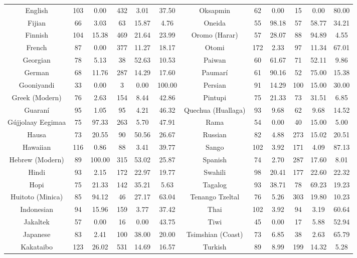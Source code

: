 \begin{tabular}{cccccccccccc}
English & 103 & 0.00 & 432 & 3.01 & 37.50 & Oksapmin & 62 & 0.00 & 15 & 0.00 & 80.00 \\
Fijian & 66 & 3.03 & 63 & 15.87 & 4.76 & Oneida & 55 & 98.18 & 57 & 58.77 & 34.21 \\
Finnish & 104 & 15.38 & 469 & 21.64 & 23.99 & Oromo (Harar) & 57 & 28.07 & 88 & 94.89 & 4.55 \\
French & 87 & 0.00 & 377 & 11.27 & 18.17 & Otomi & 172 & 2.33 & 97 & 11.34 & 67.01 \\
Georgian & 78 & 5.13 & 38 & 52.63 & 10.53 & Paiwan & 60 & 61.67 & 71 & 52.11 & 9.86 \\
German & 68 & 11.76 & 287 & 14.29 & 17.60 & Paumarí & 61 & 90.16 & 52 & 75.00 & 15.38 \\
Gooniyandi & 33 & 0.00 & 3 & 0.00 & 100.00 & Persian & 91 & 14.29 & 100 & 15.00 & 30.00 \\
Greek (Modern) & 76 & 2.63 & 154 & 8.44 & 42.86 & Pintupi & 75 & 21.33 & 73 & 31.51 & 6.85 \\
Guaraní & 95 & 1.05 & 95 & 4.21 & 46.32 & Quechua (Huallaga) & 93 & 9.68 & 62 & 9.68 & 14.52 \\
Gújjolaay Eegimaa & 75 & 97.33 & 263 & 5.70 & 47.91 & Rama & 54 & 0.00 & 40 & 15.00 & 5.00 \\
Hausa & 73 & 20.55 & 90 & 50.56 & 26.67 & Russian & 82 & 4.88 & 273 & 15.02 & 20.51 \\
Hawaiian & 116 & 0.86 & 88 & 3.41 & 39.77 & Sango & 102 & 3.92 & 171 & 4.09 & 87.13 \\
Hebrew (Modern) & 89 & 100.00 & 315 & 53.02 & 25.87 & Spanish & 74 & 2.70 & 287 & 17.60 & 8.01 \\
Hindi & 93 & 2.15 & 172 & 22.97 & 19.77 & Swahili & 98 & 20.41 & 177 & 22.60 & 22.32 \\
Hopi & 75 & 21.33 & 142 & 35.21 & 5.63 & Tagalog & 93 & 38.71 & 78 & 69.23 & 19.23 \\
Huitoto (Minica) & 85 & 94.12 & 46 & 27.17 & 63.04 & Tenango Tzeltal & 76 & 5.26 & 303 & 19.80 & 10.23 \\
Indonesian & 94 & 15.96 & 159 & 3.77 & 37.42 & Thai & 102 & 3.92 & 94 & 3.19 & 60.64 \\
Jakaltek & 57 & 0.00 & 16 & 0.00 & 43.75 & Tiwi & 45 & 0.00 & 17 & 5.88 & 52.94 \\
Japanese & 83 & 2.41 & 100 & 38.00 & 20.00 & Tsimshian (Coast) & 73 & 6.85 & 38 & 2.63 & 65.79 \\
Kakataibo & 123 & 26.02 & 531 & 14.69 & 16.57 & Turkish & 89 & 8.99 & 199 & 14.32 & 5.28 \\

\end{tabular}
